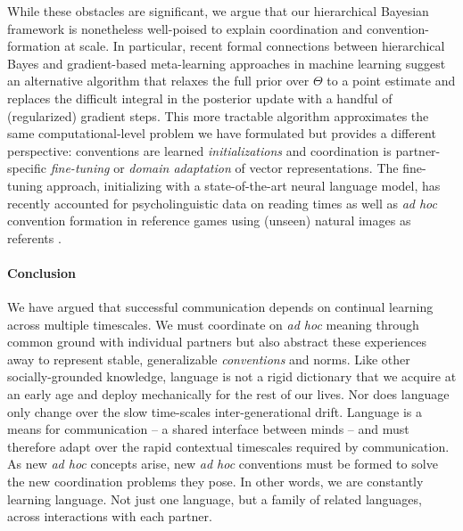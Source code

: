 While these obstacles are significant, we argue that our hierarchical Bayesian framework is nonetheless well-poised to explain coordination and convention-formation at scale. 
In particular, recent formal connections between hierarchical Bayes and gradient-based meta-learning approaches in machine learning \cite{grant_recasting_2018} suggest an alternative algorithm that relaxes the full prior over $\Theta$ to a point estimate and replaces the difficult integral in the posterior update with a handful of (regularized) gradient steps. 
This more tractable algorithm approximates the same computational-level problem we have formulated but provides a different perspective: conventions are learned \emph{initializations} and coordination is partner-specific \emph{fine-tuning} or \emph{domain adaptation} of vector representations. 
The fine-tuning approach, initializing with a state-of-the-art neural language model, has recently accounted for psycholinguistic data on reading times \cite{van2018neural} as well as \emph{ad hoc} convention formation in reference games using (unseen) natural images as referents \cite{hawkins2019continual}.

\paragraph{Conclusion}

We have argued that successful communication depends on continual learning across multiple timescales. 
We must coordinate on \emph{ad hoc} meaning through common ground with individual partners but also abstract these experiences away to represent stable, generalizable \emph{conventions} and norms.
Like other socially-grounded knowledge, language is not a rigid dictionary that we acquire at an early age and deploy mechanically for the rest of our lives. 
Nor does language only change over the slow time-scales inter-generational drift.
Language is a means for communication -- a shared interface between minds -- and must therefore adapt over the rapid contextual timescales required by communication.
As new \emph{ad hoc} concepts arise, new \emph{ad hoc} conventions must be formed to solve the new coordination problems they pose.
In other words, we are constantly learning language. 
Not just one language, but a family of related languages, across interactions with each partner. 

